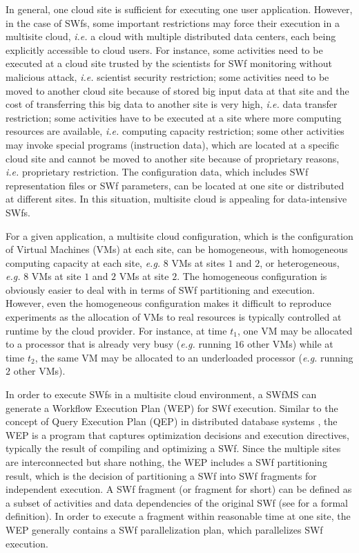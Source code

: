 In general, one cloud site is sufficient for executing one user application. However, in the case of SWfs, some important restrictions may force their execution in a multisite cloud, \textit{i.e.} a cloud with multiple distributed data centers, each being explicitly accessible to cloud users. For instance, some activities need to be executed at a cloud site trusted by the scientists for SWf monitoring without malicious attack, \textit{i.e.} scientist security restriction; some activities need to be moved to another cloud site because of stored big input data at that site and the cost of transferring this big data to another site is very high, \textit{i.e.} data transfer restriction;
some activities have to be executed at a site where more computing resources are available, \textit{i.e.} computing capacity restriction; some other activities may invoke special programs (instruction data), which are located at a specific cloud site and cannot be moved to another site because of proprietary reasons, \textit{i.e.} proprietary restriction. The configuration data, which includes SWf representation files or SWf parameters, can be located at one site or distributed at different sites. In this situation, multisite cloud is appealing for data-intensive SWfs.

For a given application, a multisite cloud configuration, which is the configuration of Virtual Machines (VMs) at each site, can be homogeneous, with homogeneous computing capacity at each site, \textit{e.g.} $8$ VMs at sites $1$ and $2$, or heterogeneous, \textit{e.g.} $8$ VMs at site $1$ and $2$ VMs at site $2$. The homogeneous configuration is obviously easier to deal with in terms of SWf partitioning and execution. However, even the homogeneous configuration makes it difficult to reproduce experiments as the allocation of VMs to real resources is typically controlled at runtime by the
cloud provider. For instance, at time $t_1$, one VM may be allocated to a processor that is already very busy (\textit{e.g.} running $16$ other VMs) while at time $t_2$, the same VM may be allocated to an underloaded processor (\textit{e.g.} running $2$ other VMs).

In order to execute SWfs in a multisite cloud environment, a SWfMS can generate a Workflow Execution Plan (WEP) for SWf execution. Similar to the concept of Query Execution Plan (QEP) in distributed database systems \cite{Ozsu2011}, the WEP is a program that captures optimization decisions and execution directives, typically the result of compiling and optimizing a SWf. 
Since the multiple sites are interconnected but share nothing, the WEP includes a SWf partitioning result, which is the decision of partitioning a SWf into SWf fragments for independent execution.
A SWf fragment (or fragment for short) can be defined as a subset of activities and data dependencies of the original SWf (see \cite{Ogasawara2011} for a formal definition). In order to execute a fragment within reasonable time at one site, the WEP generally contains a SWf parallelization plan, which parallelizes SWf execution.

